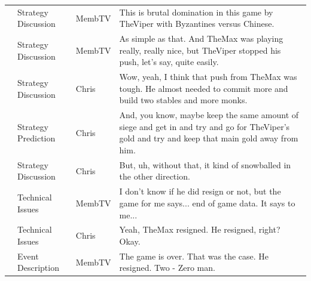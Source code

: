 {\begin{longtable}{@{}>{\theAppRow}r|L{2.3cm}L{1.0cm}U{11.55cm}@{}}
    & Strategy Discussion   & MembTV       & This is brutal domination in this game by TheViper with Byzantines versus Chinese.                                                                                                                                                                               \\
    & Strategy Discussion   & MembTV       & As simple as that. And TheMax was playing really, really nice, but TheViper stopped his push, let's say, quite easily.                                                                                                                                           \\
    & Strategy Discussion   & Chris        & Wow, yeah, I think that push from TheMax was tough. He almost needed to commit more and build two stables and more monks.                                                                                                                                        \\
    & Strategy Prediction   & Chris        & And, you know, maybe keep the same amount of siege and get in and try and go for TheViper's gold and try and keep that main gold away from him.                                                                                                                  \\
    & Strategy Discussion   & Chris        & But, uh, without that, it kind of snowballed in the other direction.                                                                                                                                                                                             \\
    & Technical Issues      & MembTV       & I don't know if he did resign or not, but the game for me says... end of game data. It says to me...                                                                                                                                                             \\
    & Technical Issues      & Chris        & Yeah, TheMax resigned. He resigned, right? Okay.                                                                                                                                                                                                                 \\
    & Event Description     & MembTV       & The game is over. That was the case. He resigned. Two - Zero man.
  \end{longtable}
}